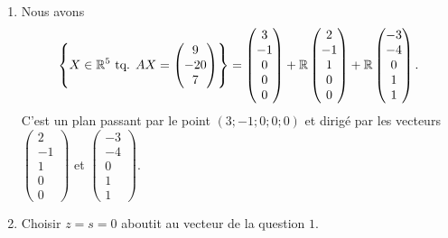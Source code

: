 {\begin{enumerate}
		Le système échelonné est équivalent à
			\[ \systeme[sort={x,y,z,t,s}]{x - 2z + 3s = 3, \\ y + z + 4s = -1, \\ t - s = 0.} \iff \systeme[sort={x,y,z,t,s}]{x = 3+2z-3s, \\ y = -1-z-4s, \\ t = s.}. \]
		Une solution $X$ du système prend donc la forme
			\[  \begin{pmatrix}x\\y\\z\\t\\s\end{pmatrix} =  \begin{pmatrix}3+2z-3s\\-1-z-4s\\z\\s\\s\end{pmatrix}, \]
		où $z, s\in\R$ sont libres.
		\item
		Nous avons
			\[ \left\{X\in\mathbb{R}^5 \text{ tq. } AX = \begin{pmatrix}9\\-20\\7\end{pmatrix} \right\} = \begin{pmatrix}3\\-1\\0\\0\\0\end{pmatrix} + \mathbb{R} \begin{pmatrix}2\\-1\\1\\0\\0\end{pmatrix} + \mathbb{R}\begin{pmatrix}-3\\-4\\0\\1\\1\end{pmatrix}. \]
		C'est un plan passant par le point $(3;-1;0;0;0)$ et dirigé par les vecteurs $\begin{pmatrix}2\\-1\\1\\0\\0\end{pmatrix}$ et $\begin{pmatrix}-3\\-4\\0\\1\\1\end{pmatrix}$.
		\item
		Choisir $z = s = 0$ aboutit au vecteur de la question $1$.
		

\end{enumerate}}
